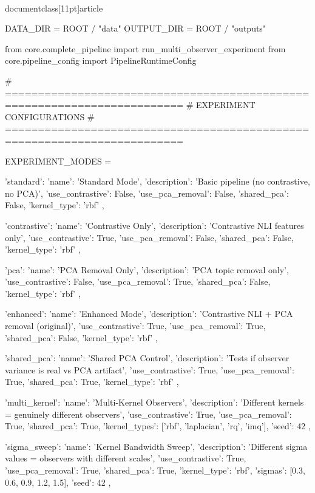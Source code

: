 \\documentclass[11pt]{article}
\begin{document}
\begin{CodeBlock}
DATA_DIR = ROOT / "data"
OUTPUT_DIR = ROOT / "outputs"

from core.complete_pipeline import run_multi_observer_experiment
from core.pipeline_config import PipelineRuntimeConfig


# =========================================================================
# EXPERIMENT CONFIGURATIONS
# =========================================================================

EXPERIMENT_MODES = {
    'standard': {
        'name': 'Standard Mode',
        'description': 'Basic pipeline (no contrastive, no PCA)',
        'use_contrastive': False,
        'use_pca_removal': False,
        'shared_pca': False,
        'kernel_type': 'rbf'
    },
    
    'contrastive': {
        'name': 'Contrastive Only',
        'description': 'Contrastive NLI features only',
        'use_contrastive': True,
        'use_pca_removal': False,
        'shared_pca': False,
        'kernel_type': 'rbf'
    },
    
    'pca': {
        'name': 'PCA Removal Only',
        'description': 'PCA topic removal only',
        'use_contrastive': False,
        'use_pca_removal': True,
        'shared_pca': False,
        'kernel_type': 'rbf'
    },
    
    'enhanced': {
        'name': 'Enhanced Mode',
        'description': 'Contrastive NLI + PCA removal (original)',
        'use_contrastive': True,
        'use_pca_removal': True,
        'shared_pca': False,
        'kernel_type': 'rbf'
    },
    
    'shared_pca': {
        'name': 'Shared PCA Control',
        'description': 'Tests if observer variance is real vs PCA artifact',
        'use_contrastive': True,
        'use_pca_removal': True,
        'shared_pca': True,
        'kernel_type': 'rbf'
    },
    
    'multi_kernel': {
        'name': 'Multi-Kernel Observers',
        'description': 'Different kernels = genuinely different observers',
        'use_contrastive': True,
        'use_pca_removal': True,
        'shared_pca': True,
        'kernel_types': ['rbf', 'laplacian', 'rq', 'imq'],
        'seed': 42
    },
    
    'sigma_sweep': {
        'name': 'Kernel Bandwidth Sweep',
        'description': 'Different sigma values = observers with different scales',
        'use_contrastive': True,
        'use_pca_removal': True,
        'shared_pca': True,
        'kernel_type': 'rbf',
        'sigmas': [0.3, 0.6, 0.9, 1.2, 1.5],
        'seed': 42
    },
    
}
\end{CodeBlock}
\end{document}
